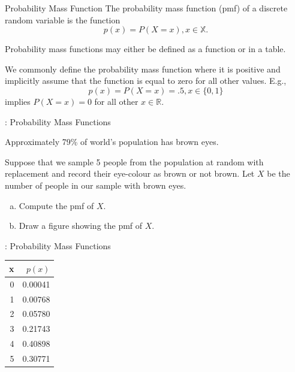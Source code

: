 \begin{frame}
  \begin{block}{Probability Mass Function}
    The probability mass function (pmf) of a discrete random variable is the function
    \[
      p(x)=P(X=x), x \in \mathbb X.
    \]

    \pause
    
    \medskip

    Probability mass functions may either be defined as a function or in a table.

    \medskip


    \pause 
    
    We commonly define the probability mass function where it is positive and implicitly assume that the function is equal to zero for all other values. E.g.,
    \[
      p(x)=P(X=x)=.5, x \in \{0,1\}
    \]
    implies $P(X=x)=0$ for all other $x \in \mathbb R$. 
    
  \end{block}
\end{frame}

\begin{frame}

  \begin{block}{\example: Probability Mass Functions}

    Approximately 79\% of world's population has brown eyes. 
    
    \bigskip
    
    Suppose that we sample 5 people from the population at random with replacement and record their eye-colour as brown or not brown. Let $X$ be the number of people in our sample with brown eyes.
    
    \bigskip

    \begin{enumerate}[a)]
    \item Compute the pmf of $X$.
    \item Draw a figure showing the pmf of $X$. 
    \end{enumerate}
  \end{block}
\end{frame}



\begin{frame}
\begin{block}{\example: Probability Mass Functions}
\begin{table}[ht]
\centering
\begin{tabular}{rr}
  \hline
x & $p(x)$ \\ 
  \hline
     0 & 0.00041 \\ 
       1 & 0.00768 \\ 
       2 & 0.05780 \\ 
       3 & 0.21743 \\ 
       4 & 0.40898 \\ 
       5 & 0.30771 \\ 
   \hline
\end{tabular}
\end{table}

\end{block}
\end{frame}

